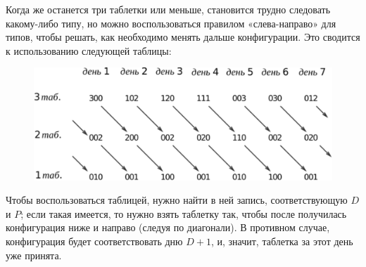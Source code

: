 Когда же останется три таблетки или меньше, становится трудно следовать какому-либо типу, но можно воспользоваться правилом «слева-направо» для типов, чтобы решать, как необходимо менять дальше конфигурации.
Это сводится к использованию следующей таблицы:

\begin{figure}[h!]
\centering
\includegraphics[scale=0.6]{Figs/Handicaps/3box-ru}
\end{figure}

Чтобы воспользоваться таблицей, нужно найти в ней запись, соответствующую $D$ и $P$;
если такая имеется, то нужно взять таблетку так, чтобы после получилась конфигурация ниже и направо (следуя по диагонали).
В противном случае, конфигурация будет соответствовать дню $D+1$, и, значит, таблетка за этот день уже принята.
